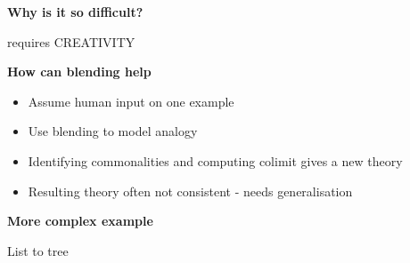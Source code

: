 \documentclass{beamer}
\begin{document}
\newpage

\begin{frame}
\begin{center}{\bf Why is it so difficult?}\end{center}
requires CREATIVITY

\end{frame}

\newpage

\begin{frame}
\begin{center}{\bf How can blending help}\end{center}
\begin{itemize}
\item{Assume human input on one example}
\item{Use blending to model analogy}
\item{Identifying commonalities and computing colimit gives a new theory}
\item{Resulting theory often not consistent - needs generalisation}
\end{itemize}
\end{frame}

\newpage

\begin{frame}
\begin{center}{\bf More complex example}\end{center}
List to tree


\end{frame}
\end{document}

